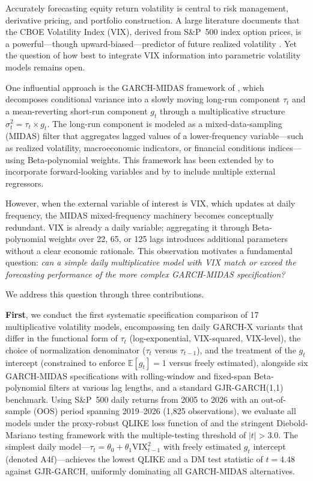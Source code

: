 \documentclass[12pt,a4paper]{article}
\newcommand{\E}{\mathbb{E}}
\begin{document}
Accurately forecasting equity return volatility is central to risk management, derivative pricing, and portfolio construction. A large literature documents that the CBOE Volatility Index (VIX), derived from S\&P~500 index option prices, is a powerful---though upward-biased---predictor of future realized volatility \citep{christensen1998, jiang2005, bekaert2014}. Yet the question of how best to integrate VIX information into parametric volatility models remains open.

One influential approach is the GARCH-MIDAS framework of \citet{engle2013}, which decomposes conditional variance into a slowly moving long-run component $\tau_t$ and a mean-reverting short-run component $g_t$ through a multiplicative structure $\sigma_t^2 = \tau_t \times g_t$. The long-run component is modeled as a mixed-data-sampling (MIDAS) filter that aggregates lagged values of a lower-frequency variable---such as realized volatility, macroeconomic indicators, or financial conditions indices---using Beta-polynomial weights. This framework has been extended by \citet{conrad2015} to incorporate forward-looking variables and by \citet{conrad2020} to include multiple external regressors.

However, when the external variable of interest is VIX, which updates at daily frequency, the MIDAS mixed-frequency machinery becomes conceptually redundant. VIX is already a daily variable; aggregating it through Beta-polynomial weights over 22, 65, or 125 lags introduces additional parameters without a clear economic rationale. This observation motivates a fundamental question: \emph{can a simple daily multiplicative model with VIX match or exceed the forecasting performance of the more complex GARCH-MIDAS specification?}

We address this question through three contributions.

\textbf{First}, we conduct the first systematic specification comparison of 17 multiplicative volatility models, encompassing ten daily GARCH-X variants that differ in the functional form of $\tau_t$ (log-exponential, VIX-squared, VIX-level), the choice of normalization denominator ($\tau_t$ versus $\tau_{t-1}$), and the treatment of the $g_t$ intercept (constrained to enforce $\E[g_t]=1$ versus freely estimated), alongside six GARCH-MIDAS specifications with rolling-window and fixed-span Beta-polynomial filters at various lag lengths, and a standard GJR-GARCH(1,1) benchmark. Using S\&P~500 daily returns from 2005 to 2026 with an out-of-sample (OOS) period spanning 2019--2026 (1,825 observations), we evaluate all models under the proxy-robust QLIKE loss function of \citet{patton2011} and the stringent Diebold-Mariano testing framework with the \citet{harvey2016} multiple-testing threshold of $|t| > 3.0$. The simplest daily model---$\tau_t = \theta_0 + \theta_1 \mathrm{VIX}_{t-1}^2$ with freely estimated $g_t$ intercept (denoted A4f)---achieves the lowest QLIKE and a DM test statistic of $t = 4.48$ against GJR-GARCH, uniformly dominating all GARCH-MIDAS alternatives.
\end{document}
